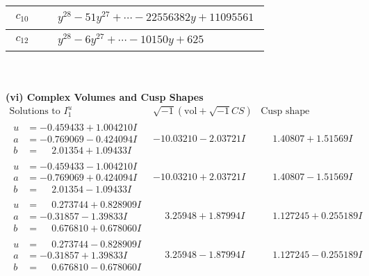 \documentclass[1p]{elsarticle_modified}
\theoremstyle{definition}
\newcommand{\I}{\sqrt{-1}}
\begin{document}
\begin{tabular}{m{50pt}|m{274pt}}
\hline $$\begin{aligned}c_{10}\end{aligned}$$&$\begin{aligned}
&y^{28}-51 y^{27}+\cdots-22556382 y+11095561
\end{aligned}$\\
\hline $$\begin{aligned}c_{12}\end{aligned}$$&$\begin{aligned}
&y^{28}-6 y^{27}+\cdots-10150 y+625
\end{aligned}$\\
\hline
\end{tabular}\\~\\
\newpage\flushleft \textbf{(vi) Complex Volumes and Cusp Shapes}
$$\begin{array}{c|c|c}  
\text{Solutions to }I^u_{1}& \I (\text{vol} + \sqrt{-1}CS) & \text{Cusp shape}\\
 \hline 
\begin{aligned}
u &= -0.459433 + 1.004210 I \\
a &= -0.769069 - 0.424094 I \\
b &= \phantom{-}2.01354 + 1.09433 I\end{aligned}
 & -10.03210 - 2.03721 I & \phantom{-}1.40807 + 1.51569 I \\ \hline\begin{aligned}
u &= -0.459433 - 1.004210 I \\
a &= -0.769069 + 0.424094 I \\
b &= \phantom{-}2.01354 - 1.09433 I\end{aligned}
 & -10.03210 + 2.03721 I & \phantom{-}1.40807 - 1.51569 I \\ \hline\begin{aligned}
u &= \phantom{-}0.273744 + 0.828909 I \\
a &= -0.31857 - 1.39833 I \\
b &= \phantom{-}0.676810 + 0.678060 I\end{aligned}
 & \phantom{-}3.25948 + 1.87994 I & \phantom{-}1.127245 + 0.255189 I \\ \hline\begin{aligned}
u &= \phantom{-}0.273744 - 0.828909 I \\
a &= -0.31857 + 1.39833 I \\
b &= \phantom{-}0.676810 - 0.678060 I\end{aligned}
 & \phantom{-}3.25948 - 1.87994 I & \phantom{-}1.127245 - 0.255189 I \\ \hline\begin{aligned}

\end{aligned}
\end{array}$$
\end{document}
